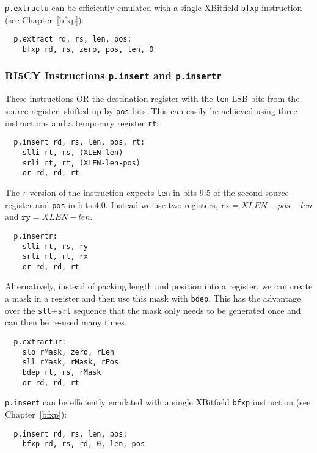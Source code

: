 {\tt p.extractu} can be efficiently emulated with a single XBitfield {\tt bfxp}
instruction (see Chapter~\ref{bfxp}):

\begin{verbatim}
  p.extract rd, rs, len, pos:
    bfxp rd, rs, zero, pos, len, 0
\end{verbatim}

\subsubsection{RI5CY Instructions {\tt p.insert} and {\tt p.insertr}}

These instructions OR the destination register with the {\tt len} LSB bits
from the source register, shifted up by {\tt pos} bits. This can easily
be achieved using three instructions and a temporary register {\tt rt}:

\begin{verbatim}
  p.insert rd, rs, len, pos, rt:
    slli rt, rs, (XLEN-len)
    srli rt, rt, (XLEN-len-pos)
    or rd, rd, rt
\end{verbatim}

The {\tt r}-version of the instruction expects {\tt len} in bits 9:5 of the
second source register and {\tt pos} in bits 4:0. Instead we use two registers,
$\texttt{rx} = XLEN-pos-len$ and $\texttt{ry} = XLEN-len$.

\begin{verbatim}
  p.insertr:
    slli rt, rs, ry
    srli rt, rt, rx
    or rd, rd, rt
\end{verbatim}

Alternatively, instead of packing length and position into a register, we
can create a mask in a register and then use this mask with {\tt bdep}. This
has the advantage over the {\tt sll}+{\tt srl} sequence that the mask only needs
to be generated once and can then be re-used many times.

\begin{verbatim}
  p.extractur:
    slo rMask, zero, rLen
    sll rMask, rMask, rPos
    bdep rt, rs, rMask
    or rd, rd, rt
\end{verbatim}

{\tt p.insert} can be efficiently emulated with a single XBitfield {\tt bfxp}
instruction (see Chapter~\ref{bfxp}):

\begin{verbatim}
  p.insert rd, rs, len, pos:
    bfxp rd, rs, rd, 0, len, pos
\end{verbatim}

